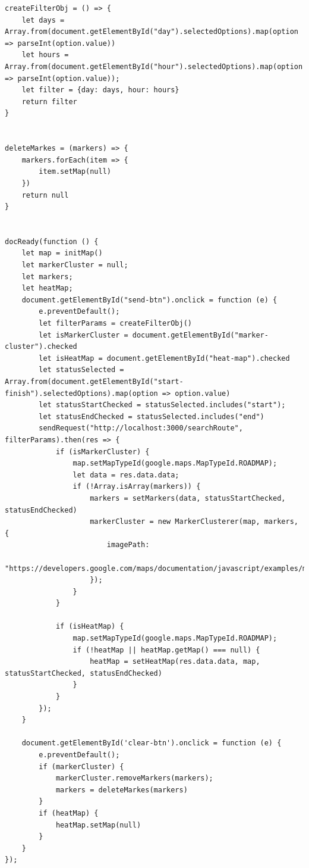 \begin{lstlisting}[label=maps_js , caption=Maps.js]
createFilterObj = () => {
    let days = Array.from(document.getElementById("day").selectedOptions).map(option => parseInt(option.value))
    let hours = Array.from(document.getElementById("hour").selectedOptions).map(option => parseInt(option.value));
    let filter = {day: days, hour: hours}
    return filter
}


deleteMarkes = (markers) => {
    markers.forEach(item => {
        item.setMap(null)
    })
    return null
}


docReady(function () {
    let map = initMap()
    let markerCluster = null;
    let markers;
    let heatMap;
    document.getElementById("send-btn").onclick = function (e) {
        e.preventDefault();
        let filterParams = createFilterObj()
        let isMarkerCluster = document.getElementById("marker-cluster").checked
        let isHeatMap = document.getElementById("heat-map").checked
        let statusSelected = Array.from(document.getElementById("start-finish").selectedOptions).map(option => option.value)
        let statusStartChecked = statusSelected.includes("start");
        let statusEndChecked = statusSelected.includes("end")
        sendRequest("http://localhost:3000/searchRoute", filterParams).then(res => {
            if (isMarkerCluster) {
                map.setMapTypeId(google.maps.MapTypeId.ROADMAP);
                let data = res.data.data;
                if (!Array.isArray(markers)) {
                    markers = setMarkers(data, statusStartChecked, statusEndChecked)
                    markerCluster = new MarkerClusterer(map, markers, {
                        imagePath:
                            "https://developers.google.com/maps/documentation/javascript/examples/markerclusterer/m",
                    });
                }
            }

            if (isHeatMap) {
                map.setMapTypeId(google.maps.MapTypeId.ROADMAP);
                if (!heatMap || heatMap.getMap() === null) {
                    heatMap = setHeatMap(res.data.data, map, statusStartChecked, statusEndChecked)
                }
            }
        });
    }

    document.getElementById('clear-btn').onclick = function (e) {
        e.preventDefault();
        if (markerCluster) {
            markerCluster.removeMarkers(markers);
            markers = deleteMarkes(markers)
        }
        if (heatMap) {
            heatMap.setMap(null)
        }
    }
});


\end{lstlisting}

